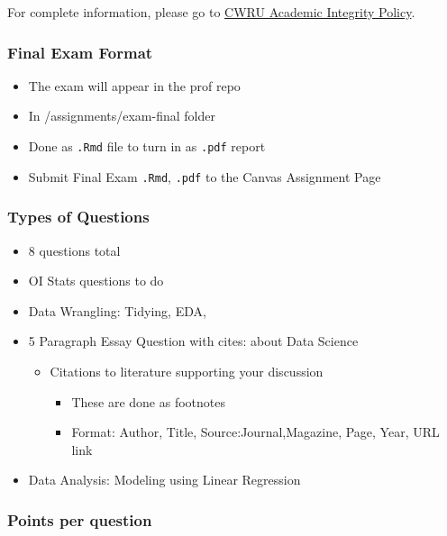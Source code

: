 \documentclass[
]{article}
\providecommand{\tightlist}{%
  \setlength{\itemsep}{0pt}\setlength{\parskip}{0pt}}
\begin{document}
For complete information, please go to
\href{https://bulletin.case.edu/undergraduate-studies/academic-integrity/}{CWRU
Academic Integrity Policy}.

\hypertarget{final-exam-format}{%
\subsubsection{Final Exam Format}\label{final-exam-format}}

\begin{itemize}
\tightlist
\item
  The exam will appear in the prof repo
\item
  In /assignments/exam-final folder
\item
  Done as \texttt{.Rmd} file to turn in as \texttt{.pdf} report
\item
  Submit Final Exam \texttt{.Rmd}, \texttt{.pdf} to the Canvas
  Assignment Page
\end{itemize}

\hypertarget{types-of-questions}{%
\subsubsection{Types of Questions}\label{types-of-questions}}

\begin{itemize}
\tightlist
\item
  8 questions total
\item
  OI Stats questions to do
\item
  Data Wrangling: Tidying, EDA,
\item
  5 Paragraph Essay Question with cites: about Data Science

  \begin{itemize}
  \tightlist
  \item
    Citations to literature supporting your discussion

    \begin{itemize}
    \tightlist
    \item
      These are done as footnotes
    \item
      Format: Author, Title, Source:Journal,Magazine, Page, Year, URL
      link
    \end{itemize}
  \end{itemize}
\item
  Data Analysis: Modeling using Linear Regression
\end{itemize}

\hypertarget{points-per-question}{%
\subsubsection{Points per question}\label{points-per-question}}
\end{document}
